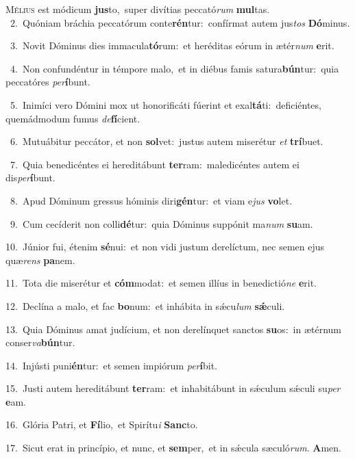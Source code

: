\lettrine{\initial\textcolor{\initialcolor}{M}}{élius} est módicum \textbf{jus}\-to,~\star super divítias peccató\textit{rum} \textbf{mul}\-tas.\\
{\numbfont\textcolor{\numbcolor}{~2.}}~Quóniam bráchia peccatórum conte\-\textbf{rén}\-tur:~\star confírmat autem jus\textit{tos} \textbf{Dó}\-minus.\par
{\numbfont\textcolor{\numbcolor}{~3.}}~Novit Dóminus dies immacula\-\textbf{tó}\-rum:~\star et heréditas eórum in ætér\textit{num} \textbf{e}\-rit.\par
{\numbfont\textcolor{\numbcolor}{~4.}}~Non confundéntur in témpore malo,~\dagger et in diébus famis satura\-\textbf{bún}\-tur:~\star quia peccatóres \textit{per}\-\textbf{í}bunt.\par
{\numbfont\textcolor{\numbcolor}{~5.}}~Inimíci vero Dómini mox ut honorificáti fúerint et exal\-\textbf{tá}\-ti:~\star deficiéntes, quemádmodum fumus \textit{de}\-\textbf{fí}cient.\par
{\numbfont\textcolor{\numbcolor}{~6.}}~Mutuábitur peccátor, et non \textbf{sol}\-vet:~\star justus autem miserétur \textit{et} \textbf{trí}\-buet.\par
{\numbfont\textcolor{\numbcolor}{~7.}}~Quia benedicéntes ei hereditábunt \textbf{ter}\-ram:~\star maledicéntes autem ei dis\-\textit{per}\-\textbf{í}bunt.\par
{\numbfont\textcolor{\numbcolor}{~8.}}~Apud Dóminum gressus hóminis diri\-\textbf{gén}\-tur:~\star et viam e\textit{jus} \textbf{vo}\-let.\par
{\numbfont\textcolor{\numbcolor}{~9.}}~Cum cecíderit non colli\-\textbf{dé}\-tur:~\star quia Dóminus suppónit ma\textit{num} \textbf{su}\-am.\par
{\numbfont\textcolor{\numbcolor}{10.}}~Júnior fui, étenim \textbf{sé}\-nui:~\star et non vidi justum derelíctum, nec semen ejus quæ\textit{rens} \textbf{pa}\-nem.\par
{\numbfont\textcolor{\numbcolor}{11.}}~Tota die miserétur et \textbf{cóm}\-modat:~\star et semen illíus in benedictió\textit{ne} \textbf{e}\-rit.\par
{\numbfont\textcolor{\numbcolor}{12.}}~Declína a malo, et fac \textbf{bo}\-num:~\star et inhábita in sǽcu\textit{lum} \textbf{sǽ}\-culi.\par
{\numbfont\textcolor{\numbcolor}{13.}}~Quia Dóminus amat judícium, et non derelínquet sanctos \textbf{su}\-os:~\star in ætérnum conser\-\textit{va}\-\textbf{bún}tur.\par
{\numbfont\textcolor{\numbcolor}{14.}}~Injústi puni\-\textbf{én}\-tur:~\star et semen impiórum \textit{per}\-\textbf{í}bit.\par
{\numbfont\textcolor{\numbcolor}{15.}}~Justi autem hereditábunt \textbf{ter}\-ram:~\star et inhabitábunt in sǽculum sǽculi su\textit{per} \textbf{e}\-am.\par
{\numbfont\textcolor{\numbcolor}{16.}}~Glória Patri, et \textbf{Fí}\-lio,~\star et Spirítu\textit{i} \textbf{Sanc}\-to.\par
{\numbfont\textcolor{\numbcolor}{17.}}~Sicut erat in princípio, et nunc, et \textbf{sem}\-per,~\star et in sǽcula sæculó\-\textit{rum}\-. \textbf{A}\-men.\par
